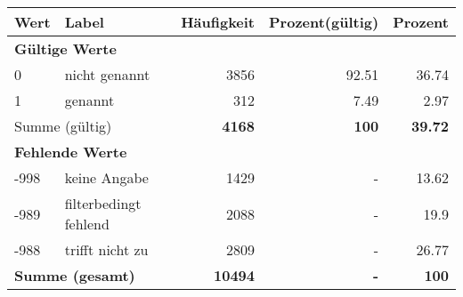      \begin{longtable}{lXrrr}
     \toprule
     \textbf{Wert} & \textbf{Label} & \textbf{Häufigkeit} & \textbf{Prozent(gültig)} & \textbf{Prozent} \\
     \endhead
     \midrule
     \multicolumn{5}{l}{\textbf{Gültige Werte}}\\

     0 &
     \multicolumn{1}{X}{ nicht genannt   } &


       \num{3856} &
       \num[round-mode=places,round-precision=2]{92.51} &
         \num[round-mode=places,round-precision=2]{36.74} \\

     1 &
     \multicolumn{1}{X}{ genannt   } &


       \num{312} &
       \num[round-mode=places,round-precision=2]{7.49} &
         \num[round-mode=places,round-precision=2]{2.97} \\
     \midrule
     \multicolumn{2}{l}{Summe (gültig)} &
       \textbf{\num{4168}} &
     \textbf{\num{100}} &
       \textbf{\num[round-mode=places,round-precision=2]{39.72}} \\
     \multicolumn{5}{l}{\textbf{Fehlende Werte}}\\
       -998 &
       keine Angabe &
         \num{1429} &
        - &
         \num[round-mode=places,round-precision=2]{13.62} \\
       -989 &
       filterbedingt fehlend &
         \num{2088} &
        - &
         \num[round-mode=places,round-precision=2]{19.9} \\
       -988 &
       trifft nicht zu &
         \num{2809} &
        - &
         \num[round-mode=places,round-precision=2]{26.77} \\
     \midrule
     \multicolumn{2}{l}{\textbf{Summe (gesamt)}} &
          \textbf{\num{10494}} &
        \textbf{-} &
        \textbf{\num{100}} \\
     \bottomrule
     \end{longtable}
     
